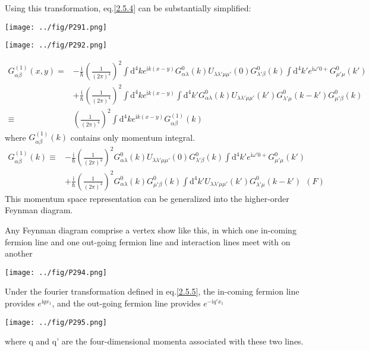 Using this transformation, eq.\eqref{2.5.4} can be substantially simplified:
\begin{center}
\texttt{[image: ../fig/P291.png]}
\end{center}\begin{center}
\texttt{[image: ../fig/P292.png]}
\end{center}
\begin{align}
G_{\alpha\beta}^{(1)}(x,y)=&-\frac{\mathrm{i}}{\hbar}(\frac{1}{(2\pi)^4})^2\int \mathrm{d}^4ke^{\mathrm{i}k(x-y)}G_{\alpha\lambda}^0(k)U_{\lambda\lambda'\mu\mu'}(0)G_{\lambda'\beta}^0(k)\int \mathrm{d}^4k'e^{\mathrm{i}\omega'0+}G_{\mu'\mu}^0(k')\nonumber \\
&+\frac{\mathrm{i}}{\hbar}(\frac{1}{(2\pi)^4})^2\int \mathrm{d}^4ke^{\mathrm{i}k(x-y)}\int \mathrm{d}^4k'G_{\alpha\lambda}^0(k)U_{\lambda\lambda'\mu\mu'}(k')G_{\lambda'\mu}^0(k-k')G_{\mu'\beta}^0(k)\nonumber \\
\equiv & (\frac{1}{(2\pi)^4})^2\int \mathrm{d}^4ke^{\mathrm{i}k(x-y)}G_{\alpha\beta}^{(1)}(k) \nonumber
\end{align}
where $G_{\alpha\beta}^{(1)}(k)$ contains only momentum integral.
\begin{align}\label{2.5.8}
G_{\alpha\beta}^{(1)}(k)\equiv &-\frac{\mathrm{i}}{\hbar}(\frac{1}{(2\pi)^4})^2G_{\alpha\lambda}^0(k)U_{\lambda\lambda'\mu\mu'}(0)G_{\lambda'\beta}^0(k)\int \mathrm{d}^4k'e^{\mathrm{i}\omega'0+}G_{\mu'\mu}^0(k') \nonumber \\
&+\frac{\mathrm{i}}{\hbar}(\frac{1}{(2\pi)^4})^2G_{\alpha\lambda}^0(k)G_{\mu'\beta}^0(k)\int \mathrm{d}^4k'U_{\lambda\lambda'\mu\mu'}(k')G_{\lambda'\mu}^0(k-k')\ \ (F)
\end{align}
This momentum space representation can be generalized into the higher-order Feynman diagram.

Any Feynman diagram comprise a vertex show like this, in which one in-coming fermion line and one out-going fermion line and interaction lines meet with on another
\begin{center}
\texttt{[image: ../fig/P294.png]}
\end{center}
Under the fourier transformation defined in eq.\eqref{2.5.5}, the in-coming fermion line provides $e^{\mathrm{i}qx_1}$, and the out-going fermion line provides $e^{-\mathrm{i}q'x_1}$
\begin{center}
\texttt{[image: ../fig/P295.png]}
\end{center}

where q and q' are the four-dimensional momenta associated with these two lines.

